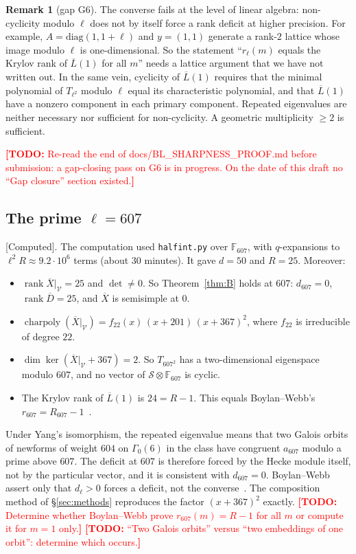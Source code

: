 \documentclass[11pt]{amsart}
\newcommand{\F}{\mathbb{F}}
\newcommand{\Db}{\overline{D}}
\newcommand{\Xb}{\overline{X}}
\newcommand{\Lb}{\overline{L}}
\newcommand{\cS}{\mathcal{S}}
\newcommand{\cV}{\mathcal{V}}
\DeclareMathOperator{\rank}{rank}
\DeclareMathOperator{\charpoly}{charpoly}
\newcommand{\st}[1]{\textup{\textsf{[#1]}}}
\newcommand{\TODO}[1]{\textcolor{red}{\textbf{[TODO:} #1\textbf{]}}}
\theoremstyle{plain}
\theoremstyle{definition}
\newtheorem{remark}[theorem]{Remark}
\numberwithin{equation}{section}
\begin{document}
\begin{remark}[gap G6]\label{rem:G6}
The converse fails at the level of linear algebra: non-cyclicity modulo $\ell$ does not by itself force a rank deficit at
higher precision. For example, $A=\mathrm{diag}(1,1+\ell)$ and $y=(1,1)$ generate a rank-$2$ lattice whose image modulo $\ell$ is
one-dimensional. So the statement ``$r_\ell(m)$ equals the Krylov rank of $\Lb(1)$ for all $m$'' needs a lattice argument
that we have not written out. In the same vein, cyclicity of $\Lb(1)$ requires that the minimal polynomial of $T_{\ell^2}$
modulo $\ell$ equal its characteristic polynomial, and that $\Lb(1)$ have a nonzero component in each primary component.
Repeated eigenvalues are neither necessary nor sufficient for non-cyclicity. A geometric multiplicity $\ge2$ is
sufficient.
\end{remark}
\TODO{Re-read the end of docs/BL\_SHARPNESS\_PROOF.md before submission: a gap-closing pass on G6 is in progress. On the
date of this draft no ``Gap closure'' section existed.}

\subsection{The prime $\ell=607$}\label{sec:607}
\st{Computed}. The computation used \texttt{halfint.py} over $\F_{607}$, with $q$-expansions to $\ell^2R\approx9.2\cdot10^6$ terms
(about 30 minutes). It gave $d=50$ and $R=25$. Moreover:
\begin{itemize}
\item $\rank\Xb|_\cV=25$ and $\det\neq0$. So Theorem~\ref{thm:B} holds at $607$: $d_{607}=0$, $\rank\Db=25$, and $\Xb$ is
  semisimple at $0$.
\item $\charpoly(\Xb|_\cV)=f_{22}(x)\,(x+201)\,(x+367)^2$, where $f_{22}$ is irreducible of degree $22$.
\item $\dim\ker(\Xb|_\cV+367)=2$. So $T_{607^2}$ has a two-dimensional eigenspace modulo $607$, and no vector of
  $\cS\otimes\F_{607}$ is cyclic.
\item The Krylov rank of $\Lb(1)$ is $24=R-1$. This equals Boylan--Webb's $r_{607}=R_{607}-1$~\cite[\S6.1]{BoylanWebb2013}.
\end{itemize}
Under Yang's isomorphism, the repeated eigenvalue means that two Galois orbits of newforms of weight $604$ on $\Gamma_0(6)$ in the
class have congruent $a_{607}$ modulo a prime above $607$. The deficit at $607$ is therefore forced by the Hecke module
itself, not by the particular vector, and it is consistent with $d_{607}=0$. Boylan--Webb assert only that $d_\ell>0$
forces a deficit, not the converse~\cite[\S6.2]{BoylanWebb2013}. The composition method of \S\ref{sec:methods} reproduces the
factor $(x+367)^2$ exactly.
\TODO{Determine whether Boylan--Webb prove $r_{607}(m)=R-1$ for all $m$ or compute it for $m=1$ only.}
\TODO{``Two Galois orbits'' versus ``two embeddings of one orbit'': determine which occurs.}
\end{document}

